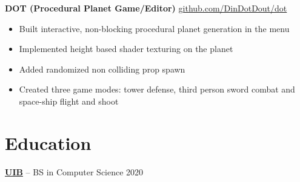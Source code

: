 \documentclass[10pt]{article}       %
\begin{document}
\textbf{DOT (Procedural Planet Game/Editor)} \hfill \href{https://github.com/DinDotDout/dot}{github.com/DinDotDout/dot} \\
\vspace{-9pt}
\begin{itemize}
	\item Built interactive, non-blocking procedural planet generation in the menu
	\item Implemented height based shader texturing on the planet
	\item Added randomized non colliding prop spawn
	\item Created three game modes: tower defense, third person sword combat and space-ship flight and shoot
\end{itemize}

\vspace{-18.5pt}

\section*{Education}
\textbf{\href{https://www.uib.eu/}{UIB}} -- BS in Computer Science \hfill 2020 \\
\end{document}
